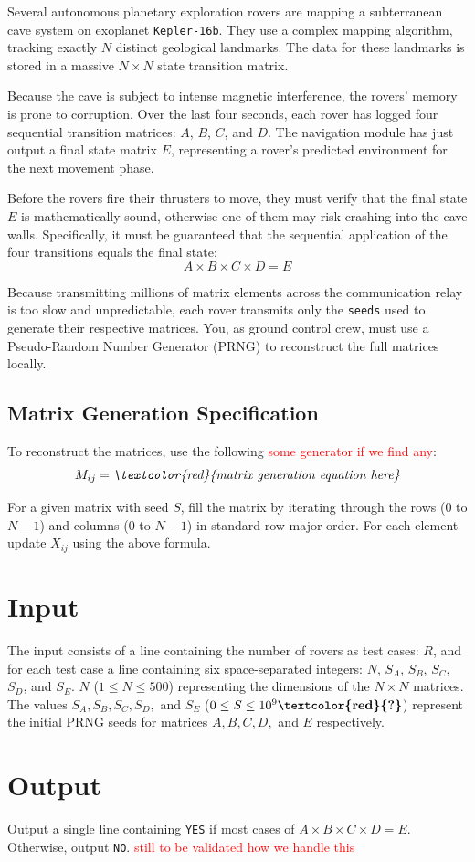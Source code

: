 

Several autonomous planetary exploration rovers are mapping a subterranean cave system on exoplanet \texttt{Kepler-16b}.
They use a complex mapping algorithm, tracking exactly $N$ distinct geological landmarks.
The data for these landmarks is stored in a massive $N \times N$ state transition matrix.

Because the cave is subject to intense magnetic interference, the rovers' memory is prone to corruption.
Over the last four seconds, each rover has logged four sequential transition matrices: $A$, $B$, $C$, and $D$.
The navigation module has just output a final state matrix $E$, representing a rover's predicted environment for the next movement phase.

Before the rovers fire their thrusters to move, they must verify that the final state $E$ is mathematically sound, 
otherwise one of them may risk crashing into the cave walls.
Specifically, it must be guaranteed that the sequential application of the four transitions equals the final state:
$$A \times B \times C \times D = E$$

Because transmitting millions of matrix elements across the communication relay is too slow and unpredictable,
each rover transmits only the \texttt{seeds} used to generate their respective matrices.
You, as ground control crew, must use a Pseudo-Random Number Generator (PRNG) to reconstruct the full matrices locally.

\subsection*{Matrix Generation Specification}

To reconstruct the matrices, use the following \textcolor{red}{some generator if we find any}:
$$M_{ij}=\textit{\textcolor{red}{matrix generation equation here}}$$

For a given matrix with seed $S$, fill the matrix by iterating through the rows ($0$ to $N-1$) and columns ($0$ to $N-1$) in standard row-major order.
For each element update $X_{ij}$ using the above formula.

\section*{Input}

The input consists of a line containing the number of rovers as test cases: $R$,
and for each test case a line containing six space-separated integers: $N$, $S_A$, $S_B$, $S_C$, $S_D$, and $S_E$. $N$ ($1 \le N \le 500$)
representing the dimensions of the $N \times N$ matrices.
The values $S_A, S_B, S_C, S_D,$ and $S_E$ ($0 \le S \le 10^9\textbf{\textcolor{red}{?}}$) represent the initial PRNG seeds for matrices $A, B, C, D,$ and $E$ respectively.

\section*{Output}

Output a single line containing \texttt{YES} if most cases of $A \times B \times C \times D = E$. Otherwise, output \texttt{NO}.
\textcolor{red}{still to be validated how we handle this}
